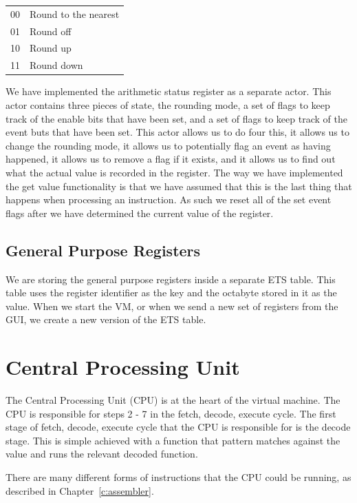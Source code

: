 \documentclass[a4paper,11pt]{report}
\begin{document}
\begin{center}
\begin{tabular}{ c l }
00 & Round to the nearest\\
01 & Round off\\
10 & Round up\\
11 & Round down\\
\end{tabular}
\end{center}

We have implemented the arithmetic status register as a separate actor. This actor contains three pieces of state, the rounding mode, a set of flags to keep track of the enable bits that have been set, and a set of flags to keep track of the event buts that have been set.
\clearpage
This actor allows us to do four this, it allows us to change the rounding mode, it allows us to potentially flag an event as having happened, it allows us to remove a flag if it exists, and it allows us to find out what the actual value is recorded in the register. The way we have implemented the get value functionality is that we have assumed that this is the last thing that happens when processing an instruction. As such we reset all of the set event flags after we have determined the current value of the register. 
\subsection{General Purpose Registers}
We are storing the general purpose registers inside a separate ETS table. This table uses the register identifier as the key and the octabyte stored in it as the value. When we start the VM, or when we send a new set of registers from the GUI, we create a new version of the ETS table.
\section{Central Processing Unit}
The Central Processing Unit (CPU) is at the heart of the virtual machine. The CPU is responsible for steps 2 - 7 in the fetch, decode, execute cycle. The first stage of fetch, decode, execute cycle that the CPU is responsible for is the decode stage. This is simple achieved with a function that pattern matches against the value and runs the relevant decoded function. 

There are many different forms of instructions that the CPU could be running, as described in Chapter~\ref{c:assembler}. 
\end{document}
